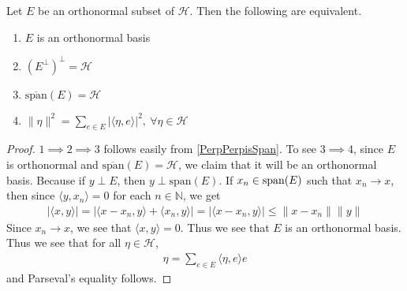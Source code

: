 \begin{corollary}
  \label{OrthonormalBaisEquiv}
  Let $E$ be an orthonormal subset of $\mathcal{H}$. Then the
  following are equivalent.
  \begin{enumerate}[label=(\arabic*)]
    \item $E$ is an orthonormal basis
    \item $(E^\perp)^\perp = \mathcal{H}$
    \item $\overline{\textrm{span}}(E) = \mathcal{H}$
    \item $\|\eta\|^2 = \sum_{e \in E} |\langle \eta ,  e \rangle
      |^2, \ \forall \eta \in \mathcal{H}$
  \end{enumerate}
\end{corollary}
\begin{proof}
  $1 \implies 2 \implies 3$ follows easily from
  \autoref{PerpPerpisSpan}. To see $3 \implies 4$, since $E$ is
  orthonormal and $\overline{\textrm{span}}(E) = \mathcal{H}$,
  we claim that it will be an orthonormal basis. Because if $y \perp E$, then $y
  \perp \textrm{span}(E)$. If $x_n \in \textrm{\textrm{span}}(E)$
  such that $x_n \to x$, then since $\langle y , x_n \rangle = 0$ for
  each $n \in \mathbb{N}$, we get
  \begin{align*}
    |\langle x , y \rangle|  = |\langle x - x_n , y \rangle + \langle
    x_n , y \rangle| = |\langle x - x_n , y \rangle| \le \|x-x_n\|\|y\|
  \end{align*}
  Since $x_n \to x$, we see that $\langle x , y \rangle = 0$. Thus we
  see that $E$ is an orthonormal basis. Thus we see that for all
  $\eta \in \mathcal{H}$,
  \begin{align*}
    \eta = \sum_{e \in E} \langle \eta ,  e \rangle e
  \end{align*}
  and Parseval's equality follows.

\end{proof}

